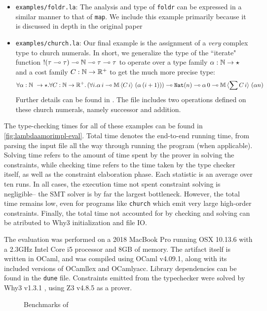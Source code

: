 \begin{itemize}
  \item \texttt{examples/foldr.la}: The analysis and type of \texttt{foldr} can be expressed in a similar manner to that of \texttt{map}. We include this example primarily because it is discussed in depth in the original \lambdaamor paper \cite{rajani-et-al:popl21}
  \item \texttt{examples/church.la}: Our final example is the assignment of a \textit{very} complex type to church numerals. In short, we generalize the type of the ``iterate" function $!(\tau \multimap \tau) \multimap \mathbb{N} \multimap \tau \multimap \tau$ to operate over a type family $\alpha : \mathbb{N} \to \star$ and a cost family $C : \mathbb{N} \to \mathbb{R}^+$ to get the much more precise type:
  $$
   \forall \alpha : \mathbb{N} \ \to \star. \forall C : \mathbb{N} \to \mathbb{R}^+. \left(\forall i. \alpha \, i \multimap \mathbb{M} \, \langle C \, i \rangle \, \left(\alpha \, (i+1)\right)\right) \multimap \texttt{Nat}(n) \multimap \alpha \, 0 \multimap \mathbb{M} \, \langle \sum C\, i\rangle \, \left(\alpha n\right)
  $$
  Further details can be found in \citet{rajani-et-al:popl21}. The file includes two operations defined on these church numerals, namely successor and addition.
\end{itemize}

The type-checking times for all of these examples can be found in \autoref{fig:lambdaamorimpl-eval}. Total time denotes the end-to-end running time, from parsing the input file all the way through running the program (when applicable). Solving time refers to the amount of time spent by the prover in solving the constraints, while checking time refers to the time taken by the type checker itself, as well as the constraint elaboration phase. Each statistic is an average over ten runs. In all cases, the execution time not spent constraint solving is negligible-- the SMT solver is by far the largest bottleneck. However, the total time remains low, even for programs like \texttt{church} which emit very large high-order constraints. Finally, the total time not accounted for by checking and solving can be atributed to Why3 initialization and file IO. 

The evaluation was performed on a 2018 MacBook Pro running OSX 10.13.6 with a 2.3GHz Intel Core i5 processor and 8GB of memory. The artifact itself is written in OCaml, and was compiled using OCaml v4.09.1, along with its included versions of OCamllex and OCamlyacc. Library dependencies can be found in the \texttt{dune} file. Constraints emitted from the typechecker were solved by Why3 v1.3.1 \citehere, using Z3 v4.8.5 \citehere as a prover.

\begin{figure}

\caption{Benchmarks of \lambdaamorimpl}
\label{fig:lambdaamorimpl-eval}
\end{figure}